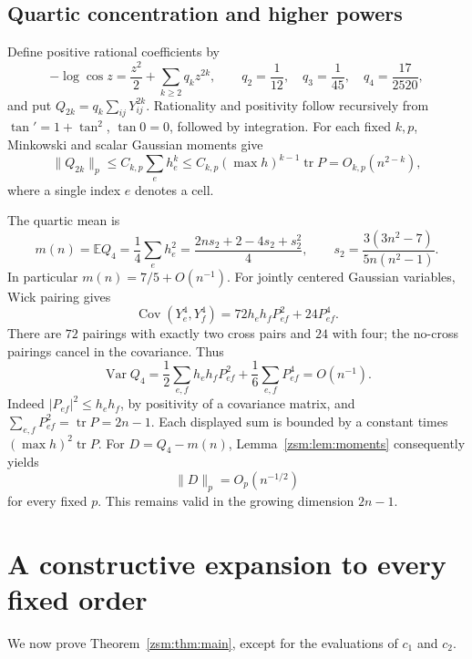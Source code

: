 \documentclass[11pt]{article}
\theoremstyle{definition}\newtheorem{definition}[theorem]{Definition}
\theoremstyle{remark}\newtheorem{remark}[theorem]{Remark}
\newcommand{\E}{\mathbb E}
\newcommand{\tr}{\operatorname{tr}}
\newcommand{\Var}{\operatorname{Var}}
\newcommand{\Cov}{\operatorname{Cov}}
\begin{document}
\subsection{Quartic concentration and higher powers}
Define positive rational coefficients by
\[
 -\log\cos z=\frac{z^2}2+\sum_{k\ge2}q_kz^{2k},\qquad
 q_2=\frac1{12},\quad q_3=\frac1{45},\quad q_4=\frac{17}{2520},
\]
and put $Q_{2k}=q_k\sum_{ij}Y_{ij}^{2k}$. Rationality and positivity follow
recursively from $\tan'=1+\tan^2$, $\tan0=0$, followed by integration.
For each fixed $k,p$, Minkowski and scalar Gaussian moments give
\begin{equation}\label{zsm:eq:Qmoments}
 \|Q_{2k}\|_p\le C_{k,p}\sum_e h_e^k
 \le C_{k,p}(\max h)^{k-1}\tr P=O_{k,p}(n^{2-k}),
\end{equation}
where a single index $e$ denotes a cell.

The quartic mean is
\begin{equation}\label{zsm:eq:m}
 m(n)=\E Q_4=\frac14\sum_eh_e^2
      =\frac{2ns_2+2-4s_2+s_2^2}{4},\qquad
 s_2=\frac{3(3n^2-7)}{5n(n^2-1)}.
\end{equation}
In particular $m(n)=7/5+O(n^{-1})$. For jointly centered Gaussian variables,
Wick pairing gives
\[
 \Cov(Y_e^4,Y_f^4)=72h_eh_fP_{ef}^2+24P_{ef}^4.
\]
There are $72$ pairings with exactly two cross pairs and $24$ with four;
the no-cross pairings cancel in the covariance. Thus
\begin{equation}\label{zsm:eq:variance}
 \Var Q_4=\frac12\sum_{e,f}h_eh_fP_{ef}^2+
          \frac16\sum_{e,f}P_{ef}^4=O(n^{-1}).
\end{equation}
Indeed $|P_{ef}|^2\le h_eh_f$, by positivity of a covariance matrix, and
$\sum_{e,f}P_{ef}^2=\tr P=2n-1$. Each displayed sum is bounded by a constant
times $(\max h)^2\tr P$.
For $D=Q_4-m(n)$, Lemma~\ref{zsm:lem:moments} consequently yields
\begin{equation}\label{zsm:eq:Dmoments}
 \|D\|_p=O_p(n^{-1/2})
\end{equation}
for every fixed $p$. This remains valid in the growing dimension $2n-1$.

\section{A constructive expansion to every fixed order}\label{zsm:sec:allorders}
We now prove Theorem~\ref{zsm:thm:main}, except for the evaluations of $c_1$ and $c_2$.
\end{document}
